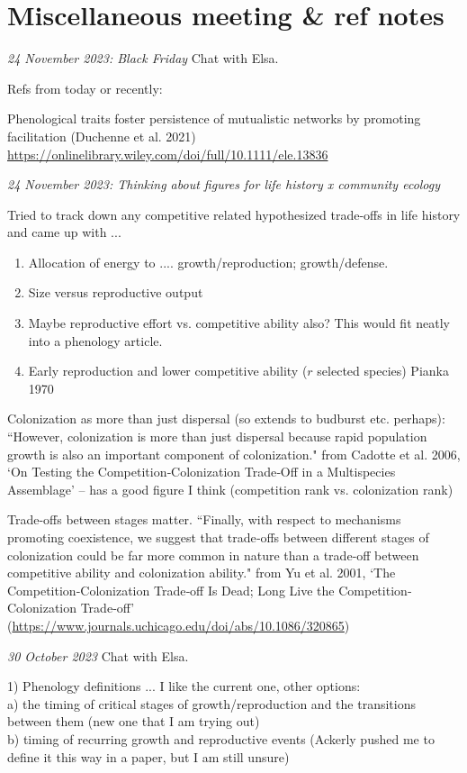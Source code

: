 \documentclass[11pt]{article}
\begin{document}
\clearpage
\section{Miscellaneous meeting \& ref notes}

\emph{24 November 2023: Black Friday} Chat with Elsa.


Refs from today or recently:

Phenological traits foster persistence of mutualistic networks by promoting facilitation (Duchenne et al. 2021) \url{https://onlinelibrary.wiley.com/doi/full/10.1111/ele.13836}

\emph{24 November 2023: Thinking about figures for life history x community ecology} 

Tried to track down any competitive related hypothesized trade-offs in life history and came up with ... 
\begin{enumerate}
\item Allocation of energy to .... growth/reproduction; growth/defense.
\item Size versus reproductive output
\item Maybe reproductive effort vs. competitive ability also? This would fit neatly into a phenology article. 
\item Early reproduction and lower competitive ability ($r$ selected species) Pianka 1970
\end{enumerate}

Colonization as more than just dispersal (so extends to budburst etc. perhaps): ``However, colonization is more than just dispersal because rapid population growth is also an important component of colonization." from Cadotte et al. 2006, `On Testing the Competition‐Colonization Trade‐Off in a Multispecies Assemblage' -- has a good figure I think (competition rank vs. colonization rank)

Trade-offs between stages matter. ``Finally, with respect to mechanisms promoting coexistence, we suggest that trade‐offs between different stages of colonization could be far more common in nature than a trade‐off between competitive ability and colonization ability." from Yu et al. 2001, `The Competition‐Colonization Trade‐off Is Dead; Long Live the Competition‐Colonization Trade‐off' (\url{https://www.journals.uchicago.edu/doi/abs/10.1086/320865})

\emph{30 October 2023} Chat with Elsa.

1) Phenology definitions ... I like the current one, other options:\\
a) the timing of critical stages of growth/reproduction and the transitions between them (new one that I am trying out)\\
b) timing of recurring growth and reproductive events (Ackerly pushed me to define it this way in a paper, but I am still unsure)\\
\end{document}
